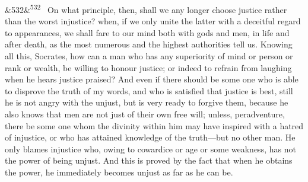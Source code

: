 \documentclass[12pt]{article}
\newcommand{\para}[1][]{\par\noindent\ifx&#1&\else\textsuperscript{\footnotesize #1}~\fi}
\begin{document}
\para[532] On what principle, then, shall we any longer choose justice rather than the worst injustice? when, if we only unite the latter with a deceitful regard to appearances, we shall fare to our mind both with gods and men, in life and after death, as the most numerous and the highest authorities tell us. Knowing all this, Socrates, how can a man who has any superiority of mind or person or rank or wealth, be willing to honour justice; or indeed to refrain from laughing when he hears justice praised? And even if there should be some one who is able to disprove the truth of my words, and who is satisfied that justice is best, still he is not angry with the unjust, but is very ready to forgive them, because he also knows that men are not just of their own free will; unless, peradventure, there be some one whom the divinity within him may have inspired with a hatred of injustice, or who has attained knowledge of the truth---but no other man. He only blames injustice who, owing to cowardice or age or some weakness, has not the power of being unjust. And this is proved by the fact that when he obtains the power, he immediately becomes unjust as far as he can be.
\end{document}
